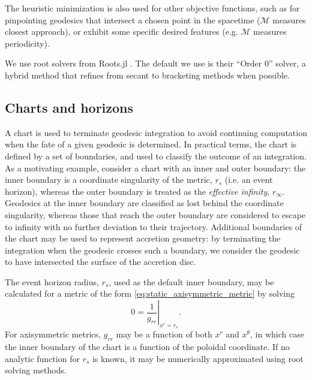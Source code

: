 The heuristic minimization is also used for other objective functions, such as for pinpointing geodesics that intersect a chosen point in the spacetime ($\mathscr{M}$ measures closest approach), or exhibit some specific desired features (e.g. $\mathscr{M}$ measures periodicity).

We use root solvers from Roots.jl \citep{}. The default we use is their ``Order 0'' solver, a hybrid method that refines from secant to bracketing methods when possible.



\subsection{Charts and horizons}

A chart is used to terminate geodesic integration to avoid continuing computation when the fate of a given geodesic is determined. In practical terms, the chart is defined by a set of boundaries, and used to classify the outcome of an integration. As a motivating example, consider a chart with an inner and outer boundary: the inner boundary is a coordinate singularity of the metric, $r_s$ (i.e. an event horizon), whereas the outer boundary is treated as the \textit{effective infinity}, $r_\infty$. Geodesics at the inner boundary are classified as lost behind the coordinate singularity, whereas those that reach the outer boundary are considered to escape to infinity with no further deviation to their trajectory. Additional boundaries of the chart may be used to represent accretion geometry: by terminating the integration when the geodesic crosses such a boundary, we consider the geodesic to have intersected the surface of the accretion disc. 

The event horizon radius, $r_s$, used as the default inner boundary, may be calculated for a metric of the form \eqref{eq:static_axisymmetric_metric} by solving
\begin{equation}
    \label{eq:event_horizon}
    0 = \left. \frac{1}{g_{rr}} \right\rvert_{x^r = r_s}.
\end{equation}
For axisymmetric metrics, $g_{rr}$ may be a function of both $x^r$ and $x^\theta$, in which case the inner boundary of the chart is a function of the poloidal coordinate. If no analytic function for $r_s$ is known, it may be numerically approximated using root solving methods.

